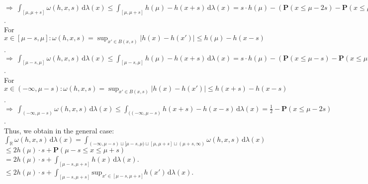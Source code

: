 \documentclass{article}
\begin{document}
$\Rightarrow \ \displaystyle{ \int_{ [ \mu , \mu + s  ] }  \omega (h,x,s)  \, \text{d}\lambda(x) \leq \int_{ [ \mu  , \mu +s  ] } h(\mu) - h(x+s)  \, \text{d}\lambda(x)  =  s\cdot h(\mu) - (\mathbf{P}(x\leq \mu - 2s)  - \mathbf{P}( x\leq \mu + s)    )  }  $.   \vspace*{-1em}  \\
For $x \in  [ \mu -s , \mu   ] :  \omega (h,x,s) = \sup_{x' \in B(x,s) } | h(x)-h(x') | \leq h(\mu) - h(x-s) $.  \vspace*{0.5em} \\
$\Rightarrow \ \displaystyle{ \int_{ [ \mu - s , \mu   ] }  \omega (h,x,s)  \, \text{d}\lambda(x) \leq \int_{ [ \mu -s , \mu  ] } h(\mu) - h(x+s)  \, \text{d}\lambda(x)  =  s\cdot h(\mu) - (\mathbf{P}( x\leq \mu - s)  - \mathbf{P}( x \leq \mu - 2s)    )  }  $.   \vspace*{-1em}  \\
For $x \in (-  \infty , \mu - s ): \omega (h,x,s) = \sup_{x' \in B(x,s) } | h(x)-h(x') | \leq h(x+s) - h(x-s) $.  \vspace*{0.5em} \\
$\Rightarrow \ \displaystyle{ \int_{ (-  \infty , \mu - s ) }  \omega (h,x,s)  \, \text{d}\lambda(x) \leq \int_{ ((-  \infty , \mu - s ) } h(x+s) - h(x-s)  \, \text{d}\lambda(x)  =  \frac{1}{2} - \mathbf{P}( x\leq \mu - 2s)      }  $.   \vspace*{0.5em}  \\
Thus, we obtain in the general case:  \vspace*{0.5em}  \\
$ \displaystyle{ \int_{ \mathbb{R} }  \omega (h,x,s)  \, \text{d}\lambda(x) = \int_{( -\infty, \mu - s) \sqcup [ \mu - s , \mu  )\sqcup [ \mu , \mu + s  ] \sqcup ( \mu + s , \infty )} \omega (h,x,s)  \, \text{d}\lambda(x) }$  \vspace*{0.7em} \\
\hspace*{2.9cm}$  \leq   2h(\mu)\cdot s + \mathbf{P}( \mu-s \leq x \leq \mu + s)   $  \vspace*{0.5em} \\
\hspace*{2.9cm}$= 2h(\mu)\cdot s + \displaystyle{ \int_{ [\mu-s, \mu+s] } h(x) \, \text{d}\lambda(x)    }  $.   \vspace*{0.5em} \\
\hspace*{2.9cm}$\leq 2h(\mu)\cdot s + \displaystyle{ \int_{ [\mu-s, \mu+s] } \text{sup}_{x'\in [\mu-s,\mu +s]} h(x') \, \text{d}\lambda(x)    }  $.   \vspace*{0.5em} \\
\end{document}
